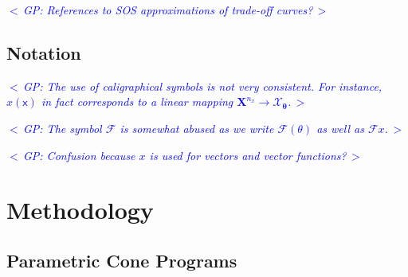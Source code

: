 \documentclass{article}
\newcommand{\commentGP}[1]{\noindent \textcolor{blue}{\emph{$<\,$GP: #1$\,>$}}}%
\newcommand{\ppar}{\theta}                          %
\newcommand{\Ppar}{{\bm{\theta}}}                   %
\newcommand{\X}{\mathbf{X}}                         %
\newcommand{\calF}{\mathcal{F}}                     %
\newcommand{\Xm}{{\bm{\mathcal{X}}_{\Ppar}}}        %
\newcommand{\cx}{\textsf{x}}        %
\newcommand{\nx}{{n_x}}             %
\begin{document}
\commentGP{References to SOS approximations of trade-off curves?}


\subsection{Notation}

\commentGP{The use of caligraphical symbols is not very consistent. For instance, $\hat{x}(\cx)$ in fact corresponds to a linear mapping $\X^\nx\rightarrow\Xm$.}

\commentGP{The symbol $\calF$ is somewhat abused as we write $\calF(\ppar)$ as well as $\calF x$.}

\commentGP{Confusion because $x$ is used for vectors and vector functions?}



\section{Methodology}\label{sec:methodology}


\subsection{Parametric Cone Programs}\label{subsec:parametric_program}
\end{document}
